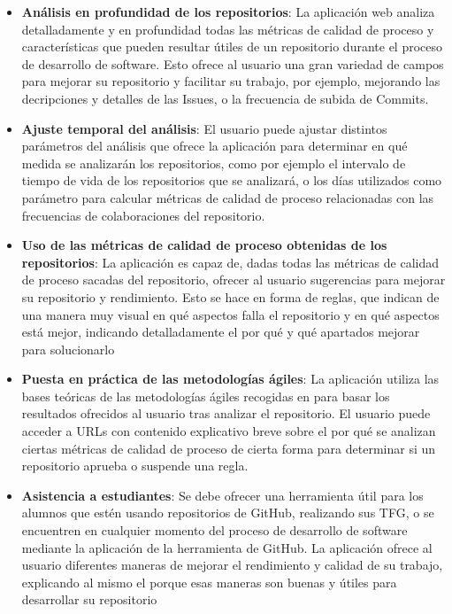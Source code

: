 \begin{itemize}
    \item \textbf{Análisis en profundidad de los repositorios}: La aplicación web analiza detalladamente y en profundidad todas las métricas de calidad de proceso y características que pueden resultar útiles de un repositorio durante el proceso de desarrollo de software. Esto ofrece al usuario una gran variedad de campos para mejorar su repositorio y facilitar su trabajo, por ejemplo, mejorando las decripciones y detalles de las Issues, o la frecuencia de subida de Commits.

    \item \textbf{Ajuste temporal del análisis}: El usuario puede ajustar distintos parámetros del análisis que ofrece la aplicación para determinar en qué medida se analizarán los repositorios, como por ejemplo el intervalo de tiempo de vida de los repositorios que se analizará, o los días utilizados como parámetro para calcular métricas de calidad de proceso relacionadas con las frecuencias de colaboraciones del repositorio.
    
    \item \textbf{Uso de las métricas de calidad de proceso obtenidas de los repositorios}: La aplicación es capaz de, dadas todas las métricas de calidad de proceso sacadas del repositorio, ofrecer al usuario sugerencias para mejorar su repositorio y rendimiento. Esto se hace en forma de reglas, que indican de una manera muy visual en qué aspectos falla el repositorio y en qué aspectos está mejor, indicando detalladamente el por qué y qué apartados mejorar para solucionarlo
    
    \item \textbf{Puesta en práctica de las metodologías ágiles}: La aplicación utiliza las bases teóricas de las metodologías ágiles recogidas en \cite{agileSubwayMap} para basar los resultados ofrecidos al usuario tras analizar el repositorio. El usuario puede acceder a URLs con contenido explicativo breve sobre el por qué se analizan ciertas métricas de calidad de proceso de cierta forma para determinar si un repositorio aprueba o suspende una regla.

    \item \textbf{Asistencia a estudiantes}: Se debe ofrecer una herramienta útil para los alumnos que estén usando repositorios de GitHub, realizando sus TFG, o se encuentren en cualquier momento del proceso de desarrollo de software mediante la aplicación de la herramienta de GitHub. La aplicación ofrece al usuario diferentes maneras de mejorar el rendimiento y calidad de su trabajo, explicando al mismo el porque esas maneras son buenas y útiles para desarrollar su repositorio
    

\end{itemize}

